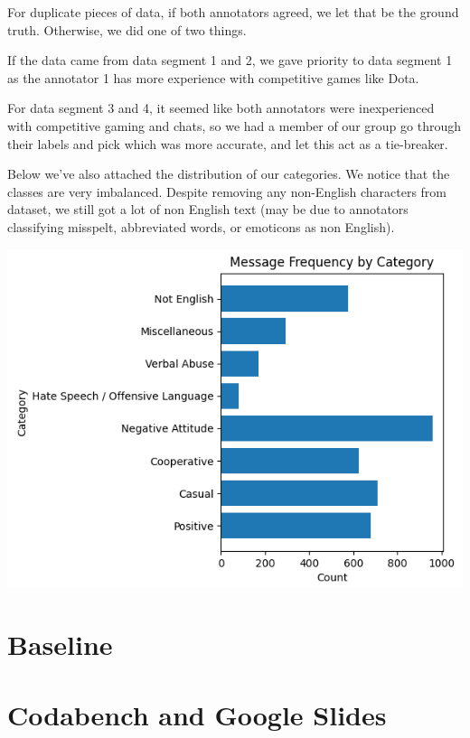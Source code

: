 \documentclass[11pt, letterpaper, notitlepage]{article}
\begin{document}
For duplicate pieces of data, if both annotators agreed, we let that be the ground truth. Otherwise, we did one of two things.

If the data came from data segment 1 and 2, we gave priority to data segment 1 as the annotator 1 has more experience with competitive games like Dota.

For data segment 3 and 4, it seemed like both annotators were inexperienced with competitive gaming and chats, so we had a member of our group go through their labels and pick which was more accurate, and let this act as a tie-breaker.

Below we've also attached the distribution of our categories. We notice that the classes are very imbalanced. Despite removing any non-English characters from dataset, we still got a lot of non English text (may be due to annotators classifying misspelt, abbreviated words, or emoticons as non English).

\includegraphics[scale=0.8]{frequency_plot}

\section[3]{Baseline}

\section[4]{Codabench and Google Slides}
\end{document}
